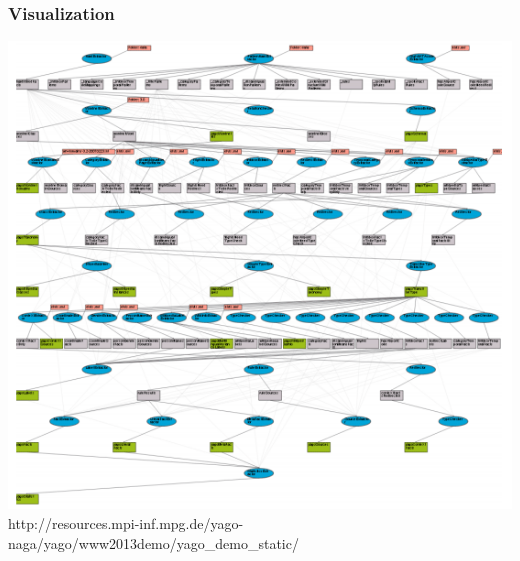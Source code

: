 \begin{frame}
\frametitle{Visualization}
\includegraphics[scale=0.32]{img/yago_visual.png}\\
http://resources.mpi-inf.mpg.de/yago-naga/yago/www2013demo/yago\_demo\_static/
\end{frame}

